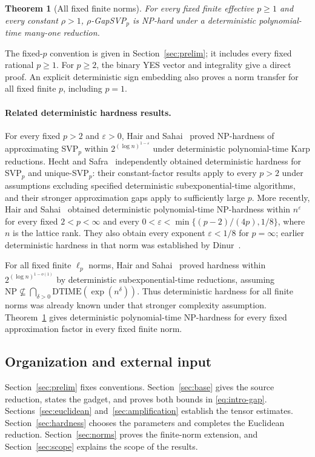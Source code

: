 \documentclass[11pt,letterpaper]{article}
\numberwithin{equation}{section}
\newtheorem{theorem}{Theorem}[section]
\theoremstyle{definition}
\theoremstyle{remark}
\begin{document}
\begin{theorem}[All fixed finite norms]\label{thm:allp}
For every fixed finite effective $p\ge1$ and every constant $\rho>1$, $\rho$-GapSVP$_p$ is NP-hard under a deterministic polynomial-time many-one reduction.
\end{theorem}

The fixed-$p$ convention is given in Section~\ref{sec:prelim}; it includes every fixed rational $p\ge1$. For $p\ge2$, the binary YES vector and integrality give a direct proof. An explicit deterministic sign embedding also proves a norm transfer for all fixed finite $p$, including $p=1$.

\paragraph{Related deterministic hardness results.}
For every fixed $p>2$ and $\varepsilon>0$, Hair and Sahai~\cite{hs-high} proved NP-hardness of approximating SVP$_p$ within $2^{(\log n)^{1-\varepsilon}}$ under deterministic polynomial-time Karp reductions. Hecht and Safra~\cite{hecht-safra} independently obtained deterministic hardness for SVP$_p$ and unique-SVP$_p$: their constant-factor results apply to every $p>2$ under assumptions excluding specified deterministic subexponential-time algorithms, and their stronger approximation gaps apply to sufficiently large $p$. More recently, Hair and Sahai~\cite{hs-poly} obtained deterministic polynomial-time NP-hardness within $n^\varepsilon$ for every fixed $2<p<\infty$ and every $0<\varepsilon<\min\{(p-2)/(4p),1/8\}$, where $n$ is the lattice rank. They also obtain every exponent $\varepsilon<1/8$ for $p=\infty$; earlier deterministic hardness in that norm was established by Dinur~\cite{dinur}.

For all fixed finite $\ell_p$ norms, Hair and Sahai~\cite{hs-all} proved hardness within $2^{(\log n)^{1-o(1)}}$ by deterministic subexponential-time reductions, assuming $\mathrm{NP}\nsubseteq\bigcap_{\delta>0}\mathrm{DTIME}(\exp(n^\delta))$. Thus deterministic hardness for all finite norms was already known under that stronger complexity assumption. Theorem~\ref{thm:allp} gives deterministic polynomial-time NP-hardness for every fixed approximation factor in every fixed finite norm.

\subsection{Organization and external input}
Section~\ref{sec:prelim} fixes conventions. Section~\ref{sec:base} gives the source reduction, states the gadget, and proves both bounds in \eqref{eq:intro-gap}. Sections~\ref{sec:euclidean} and~\ref{sec:amplification} establish the tensor estimates. Section~\ref{sec:hardness} chooses the parameters and completes the Euclidean reduction. Section~\ref{sec:norms} proves the finite-norm extension, and Section~\ref{sec:scope} explains the scope of the results.
\end{document}
